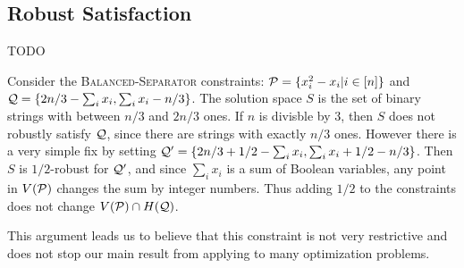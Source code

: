 \subsection{Robust Satisfaction}
TODO
\begin{example}
Consider the \textsc{Balanced-Separator} constraints: $\mathcal P = \{x_i^2 - x_i | i \in [n]\}$ and $\mathcal Q = \{2n/3 - \sum_i x_i, \sum_i x_i - n/3\}$. The solution space $S$ is the set of binary strings with between $n/3$ and $2n/3$ ones. If $n$ is divisble by $3$, then $S$ does not robustly satisfy $\mathcal Q$, since there are strings with exactly $n/3$ ones. However there is a very simple fix by setting $\mathcal Q' = \{2n/3 + 1/2 - \sum_i x_i, \sum_i x_i + 1/2 - n/3\}$. Then $S$ is $1/2$-robust for $\mathcal Q'$, and since $\sum_i x_i$ is a sum of Boolean variables, any point in $V(\mathcal P)$ changes the sum by integer numbers. Thus adding $1/2$ to the constraints does not change $V(\mathcal P) \cap H(\mathcal Q)$.
\end{example}
This argument leads us to believe that this constraint is not very restrictive and does not stop our main result from applying to many optimization problems. 

